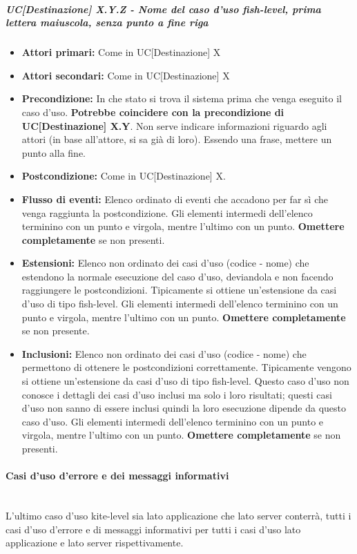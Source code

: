 \subparagraph{UC[Destinazione] X.Y.Z - Nome del caso d'uso fish-level, prima lettera maiuscola, senza punto a fine riga}%
\begin{itemize}
	\item \textbf{Attori primari:} Come in UC[Destinazione] X
	\item \textbf{Attori secondari:} Come in UC[Destinazione] X
	\item \textbf{Precondizione:} In che stato si trova il sistema prima che venga eseguito il caso d'uso. \textbf{Potrebbe coincidere con la precondizione di UC[Destinazione] X.Y}. Non serve indicare informazioni riguardo agli attori (in base all'attore, si sa già di loro). Essendo una frase, mettere un punto alla fine.
	\item \textbf{Postcondizione:} Come in UC[Destinazione] X.
	\item \textbf{Flusso di eventi:} Elenco ordinato di eventi che accadono per far sì che venga raggiunta la postcondizione. Gli elementi intermedi dell'elenco terminino con un punto e virgola, mentre l'ultimo con un punto. \textbf{Omettere completamente} se non presenti.
	\item \textbf{Estensioni:} Elenco non ordinato dei casi d'uso (codice - nome) che estendono la normale esecuzione del caso d'uso, deviandola e non facendo raggiungere le postcondizioni. Tipicamente si ottiene un'estensione da casi d'uso di tipo fish-level. Gli elementi intermedi dell'elenco terminino con un punto e virgola, mentre l'ultimo con un punto. \textbf{Omettere completamente} se non presente.
	\item \textbf{Inclusioni:} Elenco non ordinato dei casi d'uso (codice - nome) che permettono di ottenere le postcondizioni correttamente. Tipicamente vengono si ottiene un'estensione da casi d'uso di tipo fish-level. Questo caso d'uso non conosce i dettagli dei casi d'uso inclusi ma solo i loro risultati; questi casi d'uso non sanno di essere inclusi quindi la loro esecuzione dipende da questo caso d'uso. Gli elementi intermedi dell'elenco terminino con un punto e virgola, mentre l'ultimo con un punto.  \textbf{Omettere completamente} se non presenti.
\end{itemize}
\paragraph{Casi d'uso d'errore e dei messaggi informativi}\mbox{}\\
L'ultimo caso d'uso kite-level sia lato applicazione che lato server conterrà, tutti i casi d'uso d'errore e di messaggi informativi per tutti i casi d'uso lato applicazione e lato server rispettivamente.
